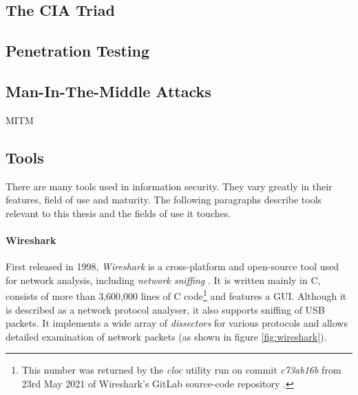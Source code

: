 \subsection{The CIA Triad}

\subsection{Penetration Testing}

\subsection{Man-In-The-Middle Attacks}
\ac{MITM}

\subsection{Tools}
There are many tools used in information security. They vary greatly in their features, field of use and maturity. The following paragraphs describe tools relevant to this thesis and the fields of use it touches.

\paragraph{Wireshark} First released in 1998, \emph{Wireshark} is a cross-platform and open-source tool used for network analysis, including \emph{network sniffing} \cite{wireshark}. It is written mainly in C, consists of more than 3,600,000 lines of C code\footnote{This number was returned by the \emph{cloc} utility run on commit \emph{c73ab16b} from 23rd May 2021 of Wireshark's GitLab source-code repository \cite{wiresharkgit}.} and features a \ac{GUI}. Although it is described as a network protocol analyser, it also supports sniffing of \ac{USB} packets. It implements a wide array of \emph{dissectors} for various protocols and allows detailed examination of network packets (as shown in figure \ref{fig:wireshark}).

